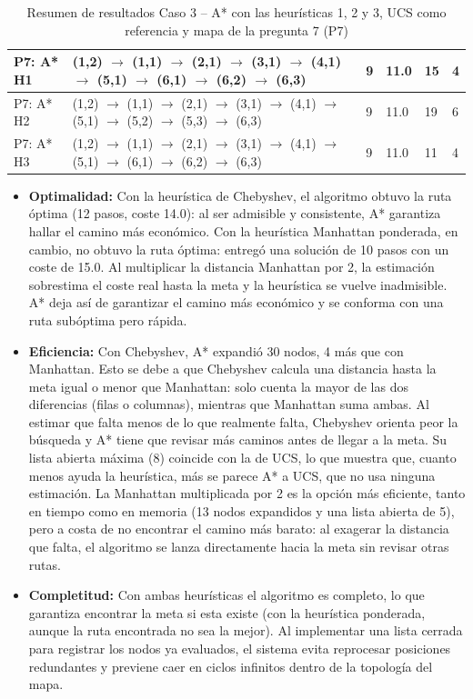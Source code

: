 \documentclass[12pt,a4paper]{article}
\begin{document}
\begin{table}[!t]
\begin{tabularx}{\textwidth}{|>{\raggedright\arraybackslash}p{2.0cm}|>{\raggedright\arraybackslash}X|C{1.1cm}|C{1.1cm}|C{1.3cm}|C{1.5cm}|}
P7: A* H1 & (1,2) $\rightarrow$ (1,1) $\rightarrow$ (2,1) $\rightarrow$ (3,1) $\rightarrow$ (4,1) $\rightarrow$ (5,1) $\rightarrow$ (6,1) $\rightarrow$ (6,2) $\rightarrow$ (6,3) & 9 & 11.0 & 15 & 4 \\ \hline
P7: A* H2 & (1,2) $\rightarrow$ (1,1) $\rightarrow$ (2,1) $\rightarrow$ (3,1) $\rightarrow$ (4,1) $\rightarrow$ (5,1) $\rightarrow$ (5,2) $\rightarrow$ (5,3) $\rightarrow$ (6,3) & 9 & 11.0 & 19 & 6 \\ \hline
P7: A* H3 & (1,2) $\rightarrow$ (1,1) $\rightarrow$ (2,1) $\rightarrow$ (3,1) $\rightarrow$ (4,1) $\rightarrow$ (5,1) $\rightarrow$ (6,1) $\rightarrow$ (6,2) $\rightarrow$ (6,3) & 9 & 11.0 & 11 & 4 \\ \hline
\end{tabularx}
\caption{Resumen de resultados Caso 3 -- A* con las heurísticas 1, 2 y 3, UCS como referencia y mapa de la pregunta 7 (P7)}
\label{tab:resultados_caso3}
\end{table}

\begin{itemize}
    \item \textbf{Optimalidad:} Con la heurística de Chebyshev, el algoritmo obtuvo la ruta óptima (12 pasos, coste 14.0): al ser admisible y consistente, A* garantiza hallar el camino más económico. Con la heurística Manhattan ponderada, en cambio, no obtuvo la ruta óptima: entregó una solución de 10 pasos con un coste de 15.0. Al multiplicar la distancia Manhattan por 2, la estimación sobrestima el coste real hasta la meta y la heurística se vuelve inadmisible. A* deja así de garantizar el camino más económico y se conforma con una ruta subóptima pero rápida.
    \item \textbf{Eficiencia:} Con Chebyshev, A* expandió 30 nodos, 4 más que con Manhattan. Esto se debe a que Chebyshev calcula una distancia hasta la meta igual o menor que Manhattan: solo cuenta la mayor de las dos diferencias (filas o columnas), mientras que Manhattan suma ambas. Al estimar que falta menos de lo que realmente falta, Chebyshev orienta peor la búsqueda y A* tiene que revisar más caminos antes de llegar a la meta. Su lista abierta máxima (8) coincide con la de UCS, lo que muestra que, cuanto menos ayuda la heurística, más se parece A* a UCS, que no usa ninguna estimación. La Manhattan multiplicada por 2 es la opción más eficiente, tanto en tiempo como en memoria (13 nodos expandidos y una lista abierta de 5), pero a costa de no encontrar el camino más barato: al exagerar la distancia que falta, el algoritmo se lanza directamente hacia la meta sin revisar otras rutas.
    \item \textbf{Completitud:} Con ambas heurísticas el algoritmo es completo, lo que garantiza encontrar la meta si esta existe (con la heurística ponderada, aunque la ruta encontrada no sea la mejor). Al implementar una lista cerrada para registrar los nodos ya evaluados, el sistema evita reprocesar posiciones redundantes y previene caer en ciclos infinitos dentro de la topología del mapa.
\end{itemize}
\end{document}
